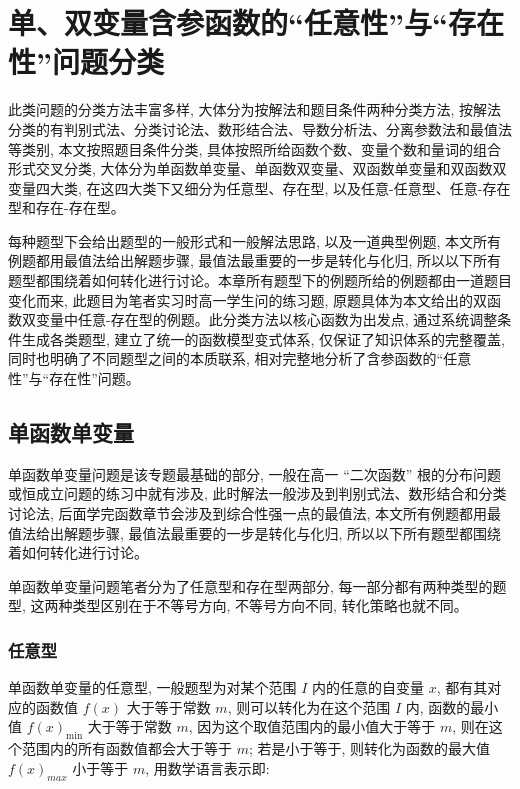 
\chapter{单、双变量含参函数的“任意性”与“存在性”问题分类}
此类问题的分类方法丰富多样, 大体分为按解法和题目条件两种分类方法, 按解法分类的有判别式法、分类讨论法、数形结合法、导数分析法、分离参数法和最值法等类别, 本文按照题目条件分类, 具体按照所给函数个数、变量个数和量词的组合形式交叉分类, 大体分为单函数单变量、单函数双变量、双函数单变量和双函数双变量四大类, 在这四大类下又细分为任意型、存在型, 以及任意-任意型、任意-存在型和存在-存在型。

每种题型下会给出题型的一般形式和一般解法思路, 以及一道典型例题, 本文所有例题都用最值法给出解题步骤, 最值法最重要的一步是转化与化归, 所以以下所有题型都围绕着如何转化进行讨论。本章所有题型下的例题所给的例题都由一道题目变化而来, 此题目为笔者实习时高一学生问的练习题, 原题具体为本文给出的双函数双变量中任意-存在型的例题。此分类方法以核心函数为出发点, 通过系统调整条件生成各类题型, 建立了统一的函数模型变式体系, 仅保证了知识体系的完整覆盖, 同时也明确了不同题型之间的本质联系, 相对完整地分析了含参函数的“任意性”与“存在性”问题。


\section{单函数单变量}
单函数单变量问题是该专题最基础的部分, 一般在高一 “二次函数” 根的分布问题或恒成立问题的练习中就有涉及, 此时解法一般涉及到判别式法、数形结合和分类讨论法, 后面学完函数章节会涉及到综合性强一点的最值法, 本文所有例题都用最值法给出解题步骤, 最值法最重要的一步是转化与化归, 所以以下所有题型都围绕着如何转化进行讨论。

单函数单变量问题笔者分为了任意型和存在型两部分, 每一部分都有两种类型的题型, 这两种类型区别在于不等号方向, 不等号方向不同, 转化策略也就不同。


\subsection{任意型}\label{subsec:任意型}
单函数单变量的任意型, 一般题型为对某个范围 \(I\) 内的任意的自变量 \(x\), 都有其对应的函数值 \(f(x)\) 大于等于常数 \(m\), 则可以转化为在这个范围 \(I\) 内, 函数的最小值 \(f(x)_{\min }\) 大于等于常数 \(m\), 因为这个取值范围内的最小值大于等于 \(m\), 则在这个范围内的所有函数值都会大于等于 \(m\); 若是小于等于, 则转化为函数的最大值 \(f{(x) }_{max}\) 小于等于 \(m\), 用数学语言表示即:

